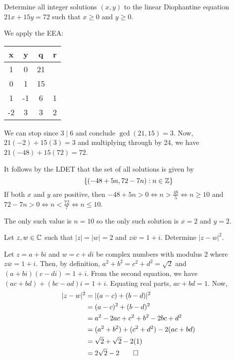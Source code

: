 \documentclass{agony}
\begin{document}
\begin{prob}
  Determine all integer solutions $(x,y)$ to the linear Diophantine equation $21x+15y=72$
  such that $x \geq 0$ and $y \geq 0$.
\end{prob}
\begin{sol}
  We apply the EEA\@:
  \begin{center}
    \begin{tabular}{C|C|C|C}
      x  & y  & q  & r \\   & 0  & 21     \\
      0  & 1  & 15     \\
      1  & -1 & 6  & 1 \\
      -2 & 3  & 3  & 2
    \end{tabular}
  \end{center}
  We can stop since $3 \mid 6$ and conclude $\gcd(21,15) = 3$.
  Now, $21(-2) + 15(3) = 3$ and multiplying through by 24, we have $21(-48) + 15(72) = 72$.

  It follows by the LDET that the set of all solutions is given by
  \[ \{ (-48 + 5n, 72 - 7n) : n \in \mathbb{Z} \} \]
  If both $x$ and $y$ are positive, then $-48 + 5n > 0 \iff n > \frac{48}{5} \iff n \geq 10$
  and $72 - 7n > 0 \iff n < \frac{72}{7} \iff n \leq 10$.

  The only such value is $n = 10$ so the only such solution is $x = 2$ and $y = 2$.
\end{sol}

\begin{prob}
  Let $z,w\in\mathbb{C}$ such that $|z| = |w| = 2$ and $z\overline{w}=1+i$.
  Determine $|z-w|^2$.
\end{prob}
\begin{sol}
  Let $z = a+bi$ and $w = c+di$ be complex numbers with modulus 2 where $z\overline{w} = 1+i$.
  Then, by definition, $a^2 + b^2 = c^2 + d^2 = \sqrt{2}$ and $(a+bi)(c-di) = 1+i$.
  From the second equation, we have $(ac + bd) + (bc - ad)i = 1+i$.
  Equating real parts, $ac + bd = 1$.
  Now, \begin{align*}
    |z-w|^2 & = |(a-c) + (b-d)|^2                      \\
            & = (a-c)^2 + (b-d)^2                      \\
            & = a^2 - 2ac + c^2 + b^2 - 2bc + d^2      \\
            & = (a^2 + b^2) + (c^2 + d^2) - 2(ac + bd) \\
            & = \sqrt{2} + \sqrt{2} - 2(1)             \\
            & = 2\sqrt{2} - 2 \qedhere
  \end{align*}
\end{sol}
\end{document}
